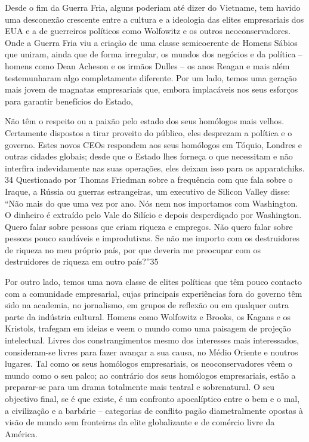  \par 
Desde o fim da Guerra Fria, alguns poderiam até dizer do Vietname, tem havido uma desconexão crescente entre a cultura e a ideologia das elites empresariais dos EUA e a de guerreiros políticos como Wolfowitz e os outros neoconservadores. Onde a Guerra Fria viu a criação de uma classe semicoerente de Homens Sábios que uniram, ainda que de forma irregular, os mundos dos negócios e da política – homens como Dean Acheson e os irmãos Dulles – os anos Reagan e mais além testemunharam algo completamente diferente. Por um lado, temos uma geração mais jovem de magnatas empresariais que, embora implacáveis ​​nos seus esforços para garantir benefícios do Estado,
 \par 
Não têm o respeito ou a paixão pelo estado dos seus homólogos mais velhos. Certamente dispostos a tirar proveito do público, eles desprezam a política e o governo. Estes novos CEOs respondem aos seus homólogos em Tóquio, Londres e outras cidades globais; desde que o Estado lhes forneça o que necessitam e não interfira indevidamente nas suas operações, eles deixam isso para os apparatchiks. {\color{blue}34} Questionado por Thomas Friedman sobre a frequência com que fala sobre o Iraque, a Rússia ou guerras estrangeiras, um executivo de Silicon Valley disse: “Não mais do que uma vez por ano. Nós nem nos importamos com Washington. O dinheiro é extraído pelo Vale do Silício e depois desperdiçado por Washington. Quero falar sobre pessoas que criam riqueza e empregos. Não quero falar sobre pessoas pouco saudáveis ​​e improdutivas. Se não me importo com os destruidores de riqueza no meu próprio país, por que deveria me preocupar com os destruidores de riqueza em outro país?”{\color{blue}35}
 \par 
Por outro lado, temos uma nova classe de elites políticas que têm pouco contacto com a comunidade empresarial, cujas principais experiências fora do governo têm sido na academia, no jornalismo, em grupos de reflexão ou em qualquer outra parte da indústria cultural. Homens como Wolfowitz e Brooks, os Kagans e os Kristols, trafegam em ideias e veem o mundo como uma paisagem de projeção intelectual. Livres dos constrangimentos mesmo dos interesses mais interessados, consideram-se livres para fazer avançar a sua causa, no Médio Oriente e noutros lugares. Tal como os seus homólogos empresariais, os neoconservadores vêem o mundo como o seu palco; ao contrário dos seus homólogos empresariais, estão a preparar-se para um drama totalmente mais teatral e sobrenatural. O seu objectivo final, se é que existe, é um confronto apocalíptico entre o bem e o mal, a civilização e a barbárie – categorias de conflito pagão diametralmente opostas à visão de mundo sem fronteiras da elite globalizante e de comércio livre da América.